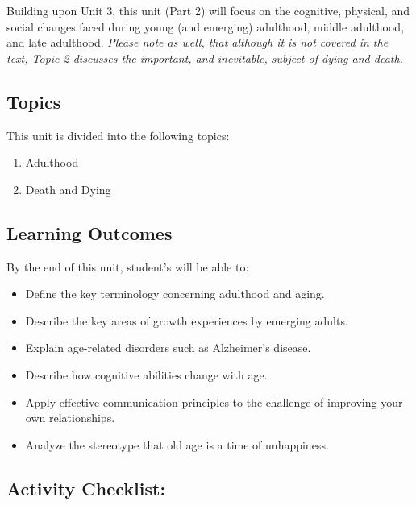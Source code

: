 \documentclass[
]{book}
\providecommand{\tightlist}{%
  \setlength{\itemsep}{0pt}\setlength{\parskip}{0pt}}
\begin{document}
Building upon Unit 3, this unit (Part 2) will focus on the cognitive, physical, and social changes faced during young (and emerging) adulthood, middle adulthood, and late adulthood. \emph{Please note as well, that although it is not covered in the text, Topic 2 discusses the important, and inevitable, subject of dying and death.}

\hypertarget{topics-3}{%
\subsection*{Topics}\label{topics-3}}

This unit is divided into the following topics:

\begin{enumerate}
\def\labelenumi{\arabic{enumi}.}
\tightlist
\item
  Adulthood\\
\item
  Death and Dying
\end{enumerate}

\hypertarget{learning-outcomes-3}{%
\subsection*{Learning Outcomes}\label{learning-outcomes-3}}

By the end of this unit, student's will be able to:

\begin{itemize}
\tightlist
\item
  Define the key terminology concerning adulthood and aging.\\
\item
  Describe the key areas of growth experiences by emerging adults.
\item
  Explain age-related disorders such as Alzheimer's disease.\\
\item
  Describe how cognitive abilities change with age.\\
\item
  Apply effective communication principles to the challenge of improving your own relationships.\\
\item
  Analyze the stereotype that old age is a time of unhappiness.
\end{itemize}

\hypertarget{activity-checklist-3}{%
\subsection*{Activity Checklist:}\label{activity-checklist-3}}
\end{document}
